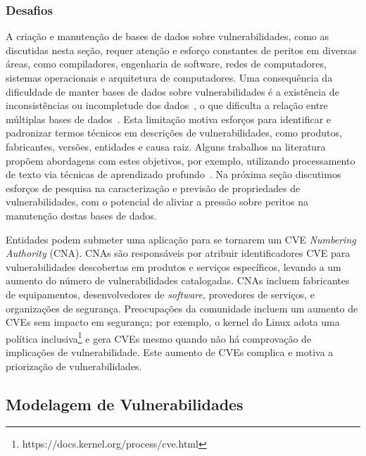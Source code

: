 \subsubsection{Desafios}\label{sec:art.data.challenges}

A criação e manutenção de bases de dados sobre vulnerabilidades, como as discutidas nesta seção, requer atenção e esforço constantes de peritos em diversas áreas, como compiladores, engenharia de software, redes de computadores, sistemas operacionais e arquitetura de computadores. Uma consequência da dificuldade de manter bases de dados sobre vulnerabilidades é a existência de inconsistências ou incompletude dos dados~\cite{anwar2021cleaning,dong2019towards,hommersom2024automated}, o que dificulta a relação entre múltiplas bases de dados~\cite{finkel2005incorporating, dong2019towards, xiao19relationships}. Esta limitação motiva esforços para identificar e padronizar termos técnicos em descrições de vulnerabilidades, como produtos, fabricantes, versões, entidades e causa raiz. Alguns trabalhos na literatura propõem abordagens com estes objetivos, por exemplo, utilizando processamento de texto via técnicas de aprendizado profundo~\cite{sun2021generating, wareus2020automated, guo2020predicting}. Na próxima seção discutimos esforços de pesquisa na caracterização e previsão de propriedades de vulnerabilidades, com o potencial de aliviar a pressão sobre peritos na manutenção destas bases de dados.

Entidades podem submeter uma aplicação para se tornarem um CVE \emph{Numbering Authority} (CNA). CNAs são responsáveis por atribuir identificadores CVE para vulnerabilidades descobertas em produtos e serviços específicos, levando a um aumento do número de vulnerabilidades catalogadas.
CNAs incluem fabricantes de equipamentos, desenvolvedores de \emph{software}, provedores de serviços, e organizações de segurança. Preocupações da comunidade incluem um aumento de CVEs sem impacto em segurança; por exemplo, o kernel do Linux adota uma política inclusiva\footnote{https://docs.kernel.org/process/cve.html} e gera CVEs mesmo quando não há comprovação de implicações de vulnerabilidade. Este aumento de CVEs complica e motiva a priorização de vulnerabilidades.

\subsection{Modelagem de Vulnerabilidades}\label{sec:art.model}

